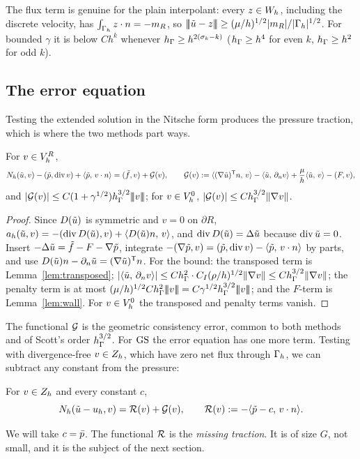 The flux term is genuine for the plain interpolant: every $z\in W_h$, including the discrete velocity, has $\int_{\Gamma_h}z\cdot n=-m_R$, so $|\!|\!|\tilde u-z|\!|\!|\ge(\mu/h)^{1/2}|m_R|/|\Gamma_h|^{1/2}$. For bounded $\gamma$ it is below $Ch^k$ whenever $h_\Gamma\ge h^{2(\sigma_k-k)}$ ($h_\Gamma\ge h^4$ for even $k$, $h_\Gamma\ge h^2$ for odd $k$).

\subsection{The error equation}
Testing the extended solution in the Nitsche form produces the pressure traction, which is where the two methods part ways.

\begin{lemma}\label{lem:erroreq}
For $v\in V_h^R$,
\[
N_h(\tilde u,v)-(\tilde p,\operatorname{div} v)+\langle \tilde p,\, v\cdot n\rangle=(\tilde f,v)+\mathcal G(v),\qquad
\mathcal G(v):=\langle (\nabla\tilde u)^{\mathsf T}n,\, v\rangle-\langle \tilde u,\, \partial_n v\rangle+\frac\mu h\langle \tilde u,\, v\rangle-(F,v),
\]
and $|\mathcal G(v)|\le C(1+\gamma^{1/2})h_\Gamma^{3/2}|\!|\!|v|\!|\!|$; for $v\in V_h^0$, $|\mathcal G(v)|\le Ch_\Gamma^{3/2}\lVert \nabla v\rVert$.
\end{lemma}

\begin{proof}
Since $D(\tilde u)$ is symmetric and $v=0$ on $\partial R$, $a_h(\tilde u,v)=-(\operatorname{div} D(\tilde u),v)+\langle D(\tilde u)n,\, v\rangle$, and $\operatorname{div} D(\tilde u)=\Delta\tilde u$ because $\operatorname{div}\tilde u=0$. Insert $-\Delta\tilde u=\tilde f-F-\nabla\tilde p$, integrate $-(\nabla\tilde p,v)=(\tilde p,\operatorname{div} v)-\langle \tilde p,\, v\cdot n\rangle$ by parts, and use $D(\tilde u)n-\partial_n\tilde u=(\nabla\tilde u)^{\mathsf T}n$. For the bound: the transposed term is Lemma~\ref{lem:transposed}; $|\langle \tilde u,\, \partial_n v\rangle|\le Ch_\Gamma^2\cdot C_I(\rho/h)^{1/2}\lVert \nabla v\rVert\le Ch_\Gamma^{3/2}\lVert \nabla v\rVert$; the penalty term is at most $(\mu/h)^{1/2}C\hG^2\tnorm v=C\gamma^{1/2}\hG^{3/2}\tnorm v$; and the $F$-term is Lemma~\ref{lem:wall}. For $v\in V_h^0$ the transposed and penalty terms vanish.
\end{proof}

The functional $\mathcal G$ is the geometric consistency error, common to both methods and of Scott's order $h_\Gamma^{3/2}$. For $\mathrm{GS}$ the error equation has one more term. Testing with divergence-free $v\in Z_h$, which have zero net flux through $\Gamma_h$, we can subtract any constant from the pressure:

\begin{corollary}\label{cor:GSerr}
For $v\in Z_h$ and every constant $c$,
\[
N_h(\tilde u-u_h,v)=\mathcal R(v)+\mathcal G(v),\qquad \mathcal R(v):=-\langle \tilde p-c,\, v\cdot n\rangle.
\]
\end{corollary}
We will take $c=\bar p$. The functional $\mathcal R$ is the \emph{missing traction}. It is of size $G$, not small, and it is the subject of the next section.

